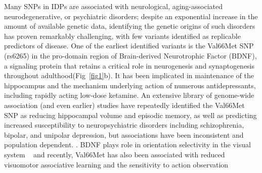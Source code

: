 \documentclass[journal=jacsat,manuscript=article]{achemso}
\begin{document}
Many SNPs in IDPs are associated with neurological, aging-associated neurodegenerative, or psychiatric disorders; despite an exponential increase in the amount of available genetic data, identifying the genetic origins of such disorders has proven remarkably challenging, with few variants identified as replicable predictors of disease.  %
One of the earliest identified variants is the Val66Met SNP (rs6265)  in the pro-domain region of Brain-derived Neurotrophic Factor (BDNF), \cite{Notaras2015} a signaling protein %
that retains a critical role in neurogenesis and synaptogenesis throughout adulthood(Fig~\ref{fig1}b).\cite{Korte1995} It has been implicated in maintenance of the hippocampus and the mechanism underlying action of numerous antidepressants, \cite{Autry2012,Bjorkholm2016} %
including rapidly acting low-dose ketamine.\cite{Autry2011}  An extensive library of genome-wide association (and even earlier) studies have repeatedly identified the Val66Met SNP as reducing hippocampal volume and episodic memory, as well as predicting increased susceptibility to neuropsychiatric disorders including schizophrenia, bipolar, and unipolar depression, but associations have been inconsistent and population dependent. \cite{soliman2010,Chen2008,Verhagen2010,Notaras2015, Autry2011}. BDNF plays role in orientation selectivity in the visual system ~\cite {Huang1999, Liu2011,Gao2014} and recently, Val66Met has also been associated with reduced visuomotor associative learning and the sensitivity to action observation \cite{Taschereau-Dumouchel2016} 
\end{document}
